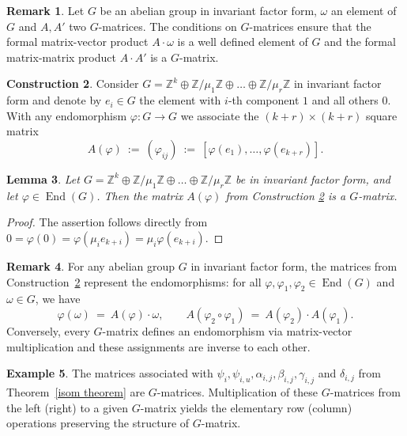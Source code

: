 \documentclass{amsart}
\DeclareMathOperator{\End}{End}
\newcommand{\Z}{\mathbb{Z}}
\newtheorem{lem}{Lemma}[section]
\theoremstyle{definition}
\newtheorem{construction}[lem]{Construction}
\newtheorem{example}[lem]{Example}
\newtheorem{remark}[lem]{Remark}
\begin{document}
\begin{remark}
Let $G$ be an abelian group in invariant factor form,
$\omega$ an element of~$G$ and $A,A'$ two $G$-matrices.  
The conditions on $G$-matrices ensure that
the formal matrix-vector product $A \cdot \omega$
is a well defined element of $G$ and the formal
matrix-matrix product $A \cdot A'$ is a $G$-matrix.
\end{remark}


\begin{construction}
\label{constr:end2mat}
Consider $G=\Z^k\oplus \Z/\mu_1\Z\oplus\dots\oplus\Z/\mu_r\Z$ in invariant factor form
and denote by $e_i\in G$ the element with $i$-th component $1$ and all others $0$.
With any endomorphism $\varphi \colon G \to G$ we associate the $(k+r) \times (k+r)$
square matrix
\[
A(\varphi)
\ := \ 
\left( \varphi_{ij} \right)
\ := \
[\varphi(e_1), \ldots, \varphi(e_{k+r})].
\]
\end{construction}


\begin{lem} \label{endomorphism lemma}
Let $G=\Z^k\oplus \Z/\mu_1\Z\oplus\dots\oplus\Z/\mu_r\Z$ be in invariant factor form,
and let $\varphi\in\End(G)$.
Then the matrix $A(\varphi)$ from Construction \ref{constr:end2mat} is a $G$-matrix.
\end{lem}

\begin{proof}
    The assertion follows directly from $ 0=\varphi(0)=\varphi(\mu_i e_{k+i})=\mu_i \varphi(e_{k+i}).
    $
\end{proof}


\begin{remark}
For any abelian group $G$ in invariant factor form, the matrices from
Construction~\ref{constr:end2mat} represent the endomorphisms:
for all $\varphi,\varphi_1,\varphi_2 \in \End(G)$ and~$\omega \in G$,
we have
\[
\varphi(\omega) \ = \ A(\varphi) \cdot \omega,
\qquad
A(\varphi_2 \circ \varphi_1) \ = \ A(\varphi_2) \cdot A(\varphi_1).
\]
Conversely, every $G$-matrix defines an endomorphism via
matrix-vector multiplication and these assignments are
inverse to each other.
\end{remark}



\begin{example}\label{ex:rowop}
The matrices associated with 
$\psi_i, \psi_{i,u}, \alpha_{i,j}, \beta_{i,j}, \gamma_{i,j}$
and $\delta_{i,j}$ from Theorem~\ref{isom theorem} are
$G$-matrices.
Multiplication of these $G$-matrices from the left (right) to a given $G$-matrix
yields the elementary row (column) operations preserving the structure of $G$-matrix.
\end{example}  
\end{document}
